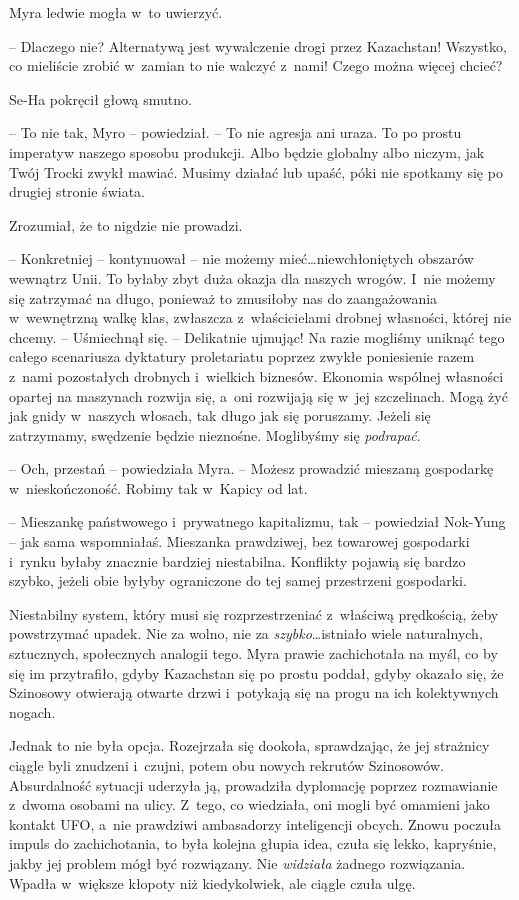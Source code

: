 \documentclass[oneside,polish,11pt,sfheadings]{mwbk}
\begin{document}
Myra ledwie mogła w~to uwierzyć.

-- Dlaczego nie? Alternatywą jest wywalczenie drogi przez Kazachstan!
Wszystko, co mieliście zrobić w~zamian to nie walczyć z~nami! Czego
można więcej chcieć?

Se-Ha pokręcił głową smutno. 

-- To nie tak, Myro -- powiedział. -- To nie
agresja ani uraza. To po prostu imperatyw naszego sposobu produkcji.
Albo będzie globalny albo niczym, jak Twój Trocki zwykł mawiać. Musimy
działać lub upaść, póki nie spotkamy się po drugiej stronie świata.

Zrozumiał, że to nigdzie nie prowadzi. 

-- Konkretniej -- kontynuował -- nie
możemy mieć\ldots niewchłoniętych obszarów wewnątrz Unii. To byłaby zbyt
duża okazja dla naszych wrogów. I~nie możemy się zatrzymać na długo,
ponieważ to zmusiłoby nas do zaangażowania w~wewnętrzną walkę klas,
zwłaszcza z~właścicielami drobnej własności, której nie chcemy. -- Uśmiechnął się. -- Delikatnie ujmując! Na razie mogliśmy uniknąć tego
całego scenariusza dyktatury proletariatu poprzez zwykłe poniesienie
razem z~nami pozostałych drobnych i~wielkich biznesów. Ekonomia wspólnej
własności opartej na maszynach rozwija się, a~oni rozwijają się w~jej
szczelinach. Mogą żyć jak gnidy w~naszych włosach, tak długo jak się
poruszamy. Jeżeli się zatrzymamy, swędzenie będzie nieznośne. Moglibyśmy
się \textit{podrapać}.

-- Och, przestań -- powiedziała Myra. -- Możesz prowadzić mieszaną
gospodarkę w~nieskończoność. Robimy tak w~Kapicy od lat.

-- Mieszankę państwowego i~prywatnego kapitalizmu, tak -- powiedział
Nok-Yung -- jak sama wspomniałaś. Mieszanka prawdziwej, bez towarowej
gospodarki i~rynku byłaby znacznie bardziej niestabilna. Konflikty
pojawią się bardzo szybko, jeżeli obie byłyby ograniczone do tej samej
przestrzeni gospodarki.

Niestabilny system, który musi się rozprzestrzeniać z~właściwą
prędkością, żeby powstrzymać upadek. Nie za wolno, nie za
\textit{szybko}\ldots istniało wiele naturalnych, sztucznych, społecznych
analogii tego. Myra prawie zachichotała na myśl, co by się im
przytrafiło, gdyby Kazachstan się po prostu poddał, gdyby okazało się,
że Szinosowy otwierają otwarte drzwi i~potykają się na progu na ich
kolektywnych nogach.

Jednak to nie była opcja. Rozejrzała się dookoła, sprawdzając, że jej
strażnicy ciągle byli znudzeni i~czujni, potem obu nowych rekrutów
Szinosowów. Absurdalność sytuacji uderzyła ją, prowadziła dyplomację
poprzez rozmawianie z~dwoma osobami na ulicy. Z~tego, co wiedziała, oni
mogli być omamieni jako kontakt UFO, a~nie prawdziwi ambasadorzy
inteligencji obcych. Znowu poczuła impuls do zachichotania, to była
kolejna głupia idea, czuła się lekko, kapryśnie, jakby jej problem mógł
być rozwiązany. Nie \textit{widziała} żadnego rozwiązania. Wpadła w~większe kłopoty niż kiedykolwiek, ale ciągle czuła ulgę.
\end{document}
